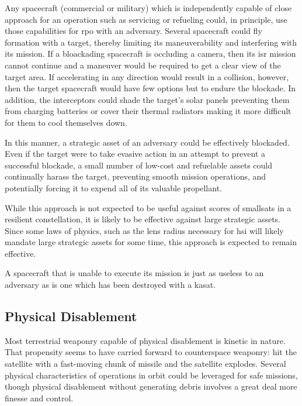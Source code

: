 Any spacecraft (commercial or military) which is independently capable
of close approach for an operation such as servicing or refueling
could, in principle, use those capabilities for \ac{rpo} with an
adversary.  Several spacecraft could fly formation with a target,
thereby limiting its maneuverability and interfering with its mission.
If a bloackading spacecraft is occluding a camera, then its \ac{isr}
mission cannot continue and a maneuver would be required to get a
clear view of the target area.  If accelerating in any direction would
result in a collision, however, then the target spacecraft would have
few options but to endure the blockade.  In addition, the interceptors
could shade the target's solar panels preventing them from charging
batteries or cover their thermal radiators making it more difficult
for them to cool themselves down.

In this manner, a strategic asset of an adversary could be effectively
blockaded.  Even if the target were to take evasive action in an
attempt to prevent a successful blockade, a small number of low-cost
and refuelable assets could continually harass the target, preventing
smooth mission operations, and potentially forcing it to expend all of
its valuable propellant.

While this approach is not expected to be useful against scores of
smallsats in a resilient constellation, it is likely to be effective
against large strategic assets. Since some laws of physics, such as
the lens radius necessary for \acf{hsi} will likely mandate large
strategic assets for some time, this approach is expected to remain
effective.

A spacecraft that is unable to execute its mission is just as useless
to an adversary as is one which has been destroyed with a \ac{kasat}.

\subsection{Physical Disablement}
Most terrestrial weaponry capable of physical disablement is kinetic
in nature.  That propensity seems to have carried forward to
counterspace weaponry: hit the satellite with a fast-moving chunk of
missile and the satellite explodes.  Several physical characteristics
of operations in orbit could be leveraged for \ac{safe} missions,
though physical disablement without generating debris involves a great
deal more finesse and control.

